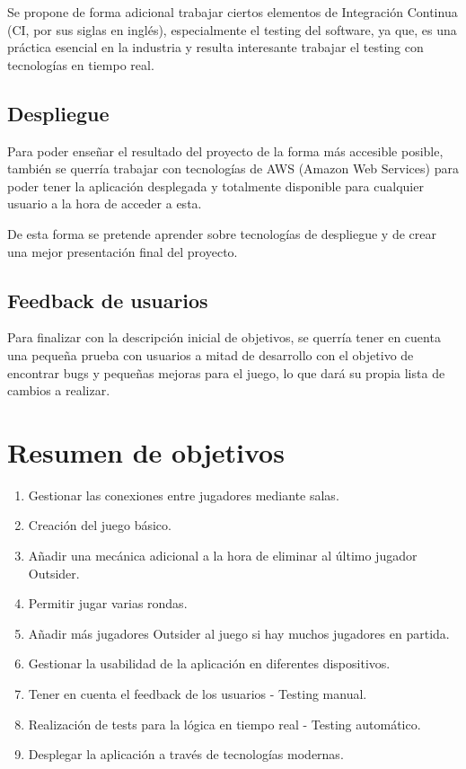 Se propone de forma adicional trabajar ciertos elementos de Integración Continua (CI, por sus siglas en inglés), especialmente el testing del software, ya que, es una práctica
esencial en la industria y resulta interesante trabajar el testing con tecnologías en tiempo real.

\subsection{Despliegue}

Para poder enseñar el resultado del proyecto de la forma más accesible posible, también se querría trabajar con tecnologías de
AWS (Amazon Web Services) para poder tener la aplicación desplegada y totalmente disponible para cualquier usuario a la hora
de acceder a esta.

De esta forma se pretende aprender sobre tecnologías de despliegue y de crear una mejor presentación final del proyecto.

\subsection{Feedback de usuarios}

Para finalizar con la descripción inicial de objetivos, se querría tener en cuenta una pequeña prueba con usuarios a mitad de
desarrollo con el objetivo de encontrar bugs y pequeñas mejoras para el juego, lo que dará su propia lista de cambios a realizar.

\section{Resumen de objetivos}

\begin{enumerate}
    \item Gestionar las conexiones entre jugadores mediante salas.
    \item Creación del juego básico.
    \item Añadir una mecánica adicional a la hora de eliminar al último jugador Outsider.
    \item Permitir jugar varias rondas.
    \item Añadir más jugadores Outsider al juego si hay muchos jugadores en partida.
    \item Gestionar la usabilidad de la aplicación en diferentes dispositivos.
    \item Tener en cuenta el feedback de los usuarios - Testing manual.
    \item Realización de tests para la lógica en tiempo real - Testing automático.
    \item Desplegar la aplicación a través de tecnologías modernas.
\end{enumerate}